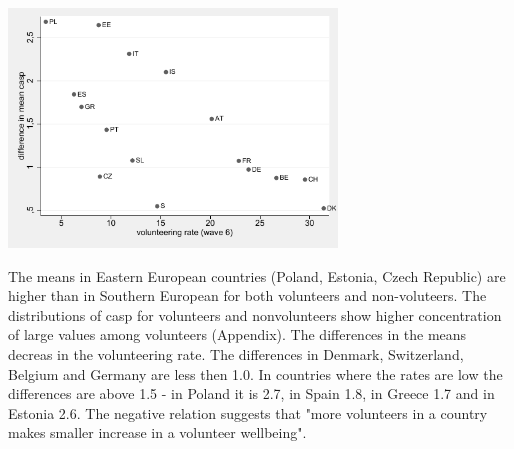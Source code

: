 \documentclass[10pt, letterpaper]{article}
\begin{document}
\begin{spacing}{1.4}
%	 


\begin{table}[H]
\begin{minipage}[b]{0.56\linewidth}
\centering
\begin{spacing}{.9}
\centering 
\begin{scriptsize} 
	 
      \label{CaspTtest} 
\end{scriptsize}
\end{spacing}
    \label{table:student}
\end{minipage}\hfill
\begin{minipage}[b]{0.4\linewidth}
\centering
{}
\includegraphics[height=2.5in]{abs_casp.pdf}
\label{fig:casp}
\end{minipage}
\end{table}


The means in Eastern European countries (Poland, Estonia, Czech Republic) are higher than in Southern European for both volunteers and non-voluteers. The distributions of casp for volunteers and nonvolunteers show higher concentration of large values among volunteers (Appendix). The differences in the means decreas in the volunteering rate.  The differences in  Denmark, Switzerland, Belgium and Germany are less then 1.0. In countries where the rates are low the differences are above 1.5 - in Poland it is 2.7, in Spain 1.8, in Greece 1.7 and in Estonia 2.6. The negative relation suggests that "more volunteers in a country makes smaller increase in a volunteer wellbeing". 


\end{spacing}
\end{document}
